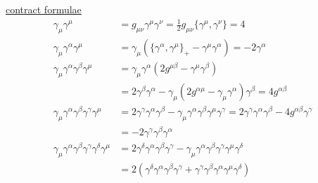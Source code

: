 \noindent
\underline{contract formulae}
\begin{equation}
\begin{split}
\gamma_\mu \gamma^\mu 
&=
g_{\mu \nu} \gamma^\mu \gamma^\nu
=
\frac{1}{2} g_{\mu \nu} \{\gamma^\mu, \gamma^\nu\}
= 4
\\
\gamma_\mu \gamma^\alpha \gamma^\mu 
&=
\gamma_\mu
\left(
\{ \gamma^\alpha, \gamma^\mu \}_+ 
- \gamma^\mu \gamma^\alpha
\right)
= -2 \gamma^\alpha
\\
\gamma_\mu \gamma^\alpha \gamma^\beta \gamma^\mu 
&=
\gamma_\mu \gamma^\alpha
\left(
2 g^{\mu \beta} - \gamma^\mu \gamma^\beta
\right)
\\
&=
2\gamma^\beta \gamma^\alpha
-
\gamma_\mu
\left(
2g^{\alpha \mu} - \gamma_\mu \gamma^\alpha
\right)
\gamma^\beta
=
4 g^{\alpha \beta}
\\
\gamma_\mu \gamma^\alpha \gamma^\beta \gamma^\gamma \gamma^\mu 
&=
2 \gamma^\gamma \gamma^\alpha \gamma^\beta
-
\gamma_\mu \gamma^\alpha \gamma^\beta \gamma^\mu  \gamma^\gamma
=
2 \gamma^\gamma \gamma^\alpha \gamma^\beta
-
4g^{\alpha \beta} \gamma^\gamma
\\
&=
- 2 \gamma^\gamma \gamma^\beta \gamma^\alpha
\\
\gamma_\mu \gamma^\alpha \gamma^\beta \gamma^\gamma \gamma^\delta \gamma^\mu 
&=
2 \gamma^\delta  \gamma^\alpha \gamma^\beta \gamma^\gamma 
-
\gamma_\mu \gamma^\alpha \gamma^\beta \gamma^\gamma \gamma^\mu  \gamma^\delta
\\
&=
2\left(
 \gamma^\delta  \gamma^\alpha \gamma^\beta \gamma^\gamma 
+
 \gamma^\gamma \gamma^\beta \gamma^\alpha \gamma^\mu  \gamma^\delta
\right)
\end{split}
\end{equation}

\bigskip

